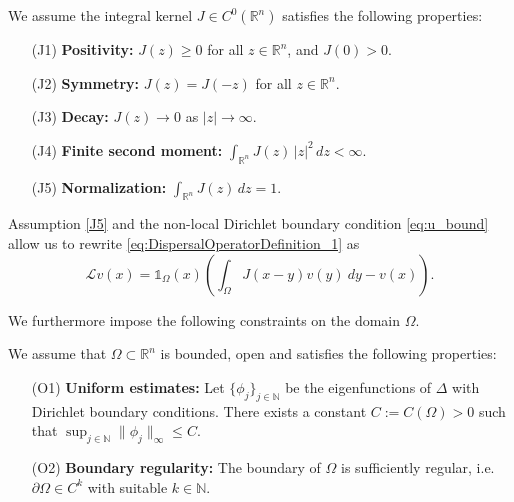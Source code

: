 \documentclass[review,onefignum,onetabnum]{SIAM-styles/siamart171218}
\makeatletter
\newcommand{\mylabel}[2]{#2\def\@currentlabel{#2}\label{#1}}
\makeatother
\begin{document}
\begin{asm}
\label{assumptions_general_kernel}
We assume the integral kernel $J \in C^0(\mathbb{R}^n)$ satisfies the following properties:
\begin{enumerate}[label=\textnormal{(\arabic*)}, leftmargin=2em]
    \item[\mylabel{J1}{(J1)}] \textbf{Positivity:} 
    $J(z) \geq 0$ for all $z \in \mathbb{R}^n$, and $J(0) > 0$. 

    \item[\mylabel{J2}{(J2)}] \textbf{Symmetry:} 
    $J(z) = J(-z)$ for all $z \in \mathbb{R}^n$. 

    \item[\mylabel{J3}{(J3)}] \textbf{Decay:} 
    $J(z) \to 0$ as $|z| \to \infty$. 

    \item[\mylabel{J4}{(J4)}] \textbf{Finite second moment:} $\int_{\mathbb{R}^n} J(z)\,|z|^2 \,dz < \infty.$

    \item[\mylabel{J5}{(J5)}] \textbf{Normalization:} $\int_{\mathbb{R}^n} J(z)\,dz = 1.$
\end{enumerate}
\end{asm}

Assumption \ref{J5} and the non-local Dirichlet boundary condition \eqref{eq:u_bound} allow us to rewrite \eqref{eq:DispersalOperatorDefinition_1} as
\begin{equation}
    \label{EQ:DispersalOperatorDefinition_2}
    \mathcal{L} v(x) = \mathds{1}_{\Omega}(x) \left(\int_{\Omega} J(x-y) v(y)\:dy - v(x)\right).
\end{equation}

We furthermore impose the following constraints on the domain $\Omega$.

\begin{asm}
\label{assumptions_domain}
We assume that $\Omega \subset \mathbb{R}^n$ is bounded, open and satisfies the following properties:
\begin{enumerate}[label=\textnormal{(\arabic*)}, leftmargin=2em]
    \item[\mylabel{O1}{(O1)}] \textbf{Uniform estimates:} 
    Let $\{\phi_j\}_{j \in \mathbb{N}}$ be the eigenfunctions of $\Delta$ with Dirichlet boundary conditions. There exists a constant $C := C(\Omega) > 0$ such that $\sup_{j \in \mathbb{N}}\|\phi_j\|_\infty \leq C$.

    \item[\mylabel{O2}{(O2)}] \textbf{Boundary regularity:} 
    The boundary of $\Omega$ is sufficiently regular, i.e.\ $\partial\Omega \in C^k$ with suitable $k \in \mathbb{N}$.
\end{enumerate}
\end{asm}
\end{document}
